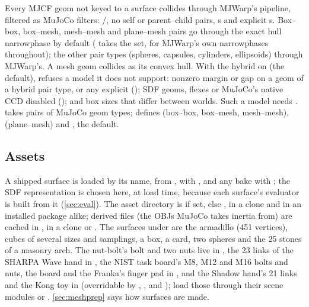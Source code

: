 Every MJCF geom not keyed to a surface collides through MJWarp's pipeline, filtered as MuJoCo filters: /, no self or parent--child pairs, s and explicit s. Box--box, box--mesh, mesh--mesh and plane--mesh pairs go through the exact hull narrowphase by default ( takes the set, \code{()} for MJWarp's own narrowphases throughout); the other pair types (spheres, capsules, cylinders, ellipsoids) through MJWarp's. A mesh geom collides as its convex hull. With the hybrid on (the default),  refuses a model it does not support: nonzero margin or gap on a geom of a hybrid pair type, or any explicit  (); SDF geoms, flexes or MuJoCo's native CCD disabled (); and box sizes that differ between worlds. Such a model needs .  takes pairs of MuJoCo geom types;  defines  (box--box, box--mesh, mesh--mesh),  (plane--mesh) and , the default.

\subsection{Assets}\label{sec:assets}

A shipped surface is loaded by its name, from , with , and any bake with ; the SDF representation is chosen here, at load time, because each surface's evaluator is built from it (\cref{sec:eval}). The asset directory is  if set, else , in a clone and in an installed package alike; derived files (the OBJs MuJoCo takes inertia from) are cached in ,  in a clone or . The surfaces under  are the armadillo (451 vertices), cubes of several sizes and samplings, a box, a card, two spheres and the 25 stones of a masonry arch. The nut-bolt's bolt and two nuts live in , the 23 links of the SHARPA Wave hand in , the NIST task board's M8, M12 and M16 bolts and nuts, the board and the Franka's finger pad in , and the Shadow hand's 21 links and the Kong toy in  (overridable by , ,  and ); load those through their scene modules or . \cref{sec:meshprep} says how surfaces are made.

